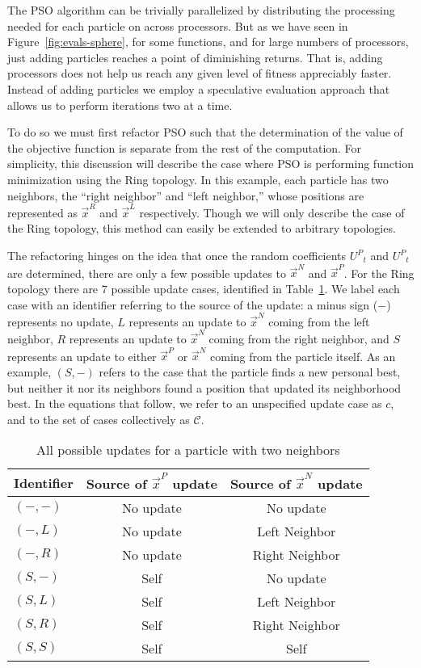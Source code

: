\documentclass{llncs}
\newcommand{\fig}[1]{Figure~\ref{fig:#1}}
\providecommand{\pers}{\ensuremath{P}}
\providecommand{\neigh}{\ensuremath{N}}
\providecommand{\leftind}{\ensuremath{L}}
\providecommand{\rightind}{\ensuremath{R}}
\providecommand{\pURand}{\ensuremath{U^\pers}}
\providecommand{\nbest}{\ensuremath{\Vec{x}^\neigh}}
\providecommand{\pbest}{\ensuremath{\Vec{x}^\pers}}
\providecommand{\leftn}{\ensuremath{\Vec{x}^\leftind}}
\providecommand{\rightn}{\ensuremath{\Vec{x}^\rightind}}
\providecommand{\caseset}{\ensuremath{\mathcal{C}}}
\providecommand{\casegen}{\ensuremath{c}}
\providecommand{\casexn}{\ensuremath{(S,-)}}
\providecommand{\casexx}{\ensuremath{(S,S)}}
\providecommand{\casexl}{\ensuremath{(S,\leftind)}}
\providecommand{\casexr}{\ensuremath{(S,\rightind)}}
\providecommand{\casepn}{\ensuremath{(-,-)}}
\providecommand{\casepl}{\ensuremath{(-,\leftind)}}
\providecommand{\casepr}{\ensuremath{(-,\rightind)}}
\begin{document}
The PSO algorithm can be trivially parallelized by distributing the processing
needed for each particle on across processors.  But as we have seen in
\fig{evals-sphere}, for some functions, and for large numbers of
processors, just adding particles reaches a point of diminishing returns.
That is, adding processors does not help us reach any given level of fitness
appreciably faster.  Instead of adding particles we employ a speculative
evaluation approach that allows us to perform iterations two at a time.

To do so we must first refactor PSO such that the determination of the value
of the objective function is separate from the rest of the computation.  For
simplicity, this discussion will describe the case where PSO is performing
function minimization using the Ring topology.  In this example, each particle
has two neighbors, the ``right neighbor'' and ``left neighbor,'' whose
positions are represented as $\rightn$ and $\leftn$ respectively.  Though we
will only describe the case of the Ring topology, this method can easily be
extended to arbitrary topologies.

The refactoring hinges on the idea that once the random coefficients $\pURand_{t}$ and $\pURand_{t}$ are
determined, there are only a few possible updates to $\nbest$ and $\pbest$.
For the Ring topology there are 7 possible update cases, identified in
Table~\ref{tab:evals}.  We label each case with an identifier referring to the
source of the update: a minus sign ($-$) represents no update, $L$ represents
an update to $\nbest$ coming from the left neighbor, $R$ represents an update
to $\nbest$ coming from the right neighbor, and $S$ represents an update to
either $\pbest$ or $\nbest$ coming from the particle itself.  As an example,
$\casexn$ refers to the case that the particle finds a new personal best, but
neither it nor its neighbors found a position that updated its neighborhood
best.  In the equations that follow, we refer to an unspecified update case as
$\casegen$, and to the set of cases collectively as $\caseset$.

\begin{table}
  \caption{All possible updates for a particle with two neighbors}
  \label{tab:evals}
  \centering
  \begin{tabular}{lcc}
	Identifier&Source of $\pbest$ update&Source of $\nbest$ update\\
	\hline
	\hline
	$\casepn$&No update&No update\\
	\hline
	$\casepl$&No update&Left Neighbor\\
	\hline
	$\casepr$&No update&Right Neighbor\\
	\hline
	$\casexn$&Self&No update\\
	\hline
	$\casexl$&Self&Left Neighbor\\
	\hline
	$\casexr$&Self&Right Neighbor\\
	\hline
	$\casexx$&Self&Self\\
	\hline
  \end{tabular}
\end{table}
\end{document}
